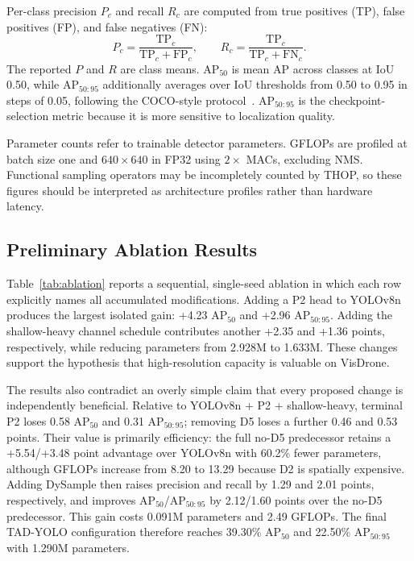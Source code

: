 \documentclass[conference]{IEEEtran}
\begin{document}
Per-class precision $P_c$ and recall $R_c$ are computed from true positives
(TP), false positives (FP), and false negatives (FN):
\begin{equation}
P_c=\frac{\mathrm{TP}_c}{\mathrm{TP}_c+\mathrm{FP}_c},\qquad
R_c=\frac{\mathrm{TP}_c}{\mathrm{TP}_c+\mathrm{FN}_c}.
\end{equation}
The reported $P$ and $R$ are class means.  AP$_{50}$ is mean AP across classes
at IoU 0.50, while AP$_{50:95}$ additionally averages over IoU thresholds from
0.50 to 0.95 in steps of 0.05, following the COCO-style
protocol~\cite{lin2014coco}.  AP$_{50:95}$ is the checkpoint-selection metric
because it is more sensitive to localization quality.

Parameter counts refer to trainable detector parameters.  GFLOPs are profiled
at batch size one and $640\times640$ in FP32 using $2\times$ MACs, excluding
NMS.  Functional sampling operators may be incompletely counted by THOP, so
these figures should be interpreted as architecture profiles rather than
hardware latency.

\subsection{Preliminary Ablation Results}
Table~\ref{tab:ablation} reports a sequential, single-seed ablation in which
each row explicitly names all accumulated modifications.  Adding a P2 head to
YOLOv8n produces the largest isolated gain: +4.23 AP$_{50}$ and +2.96
AP$_{50:95}$.  Adding the shallow-heavy channel schedule contributes another
+2.35 and +1.36 points, respectively, while reducing parameters from 2.928M
to 1.633M.  These changes support the hypothesis that high-resolution
capacity is valuable on VisDrone.

The results also contradict an overly simple claim that every proposed change
is independently beneficial.  Relative to YOLOv8n + P2 + shallow-heavy,
terminal P2 loses 0.58 AP$_{50}$ and 0.31 AP$_{50:95}$; removing D5 loses a
further 0.46 and 0.53 points.  Their value is primarily efficiency: the full
no-D5 predecessor retains a +5.54/+3.48 point advantage over YOLOv8n with
60.2\% fewer parameters, although GFLOPs increase from 8.20 to 13.29 because
D2 is spatially expensive.  Adding DySample then raises precision and recall
by 1.29 and 2.01 points, respectively, and improves AP$_{50}$/AP$_{50:95}$ by
2.12/1.60 points over the no-D5 predecessor.  This gain costs 0.091M
parameters and 2.49 GFLOPs.  The final TAD-YOLO configuration therefore
reaches 39.30\% AP$_{50}$ and 22.50\% AP$_{50:95}$ with 1.290M parameters.
\end{document}

